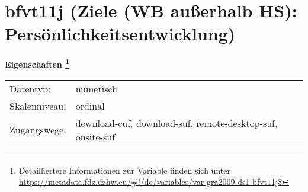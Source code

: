 
    \setcounter{footnote}{0}

    \vspace*{-1.8cm}
	\section{bfvt11j (Ziele (WB außerhalb HS): Persönlichkeitsentwicklung)}
	\label{section:bfvt11j}



    \vspace*{0.5cm}
    \noindent\textbf{Eigenschaften
	\footnote{Detailliertere Informationen zur Variable finden sich unter
		\url{https://metadata.fdz.dzhw.eu/\#!/de/variables/var-gra2009-ds1-bfvt11j$}}}\\
	\begin{tabularx}{\hsize}{@{}lX}
	Datentyp: & numerisch \\
	Skalenniveau: & ordinal \\
	Zugangswege: &
	  download-cuf, 
	  download-suf, 
	  remote-desktop-suf, 
	  onsite-suf
 \\
    \end{tabularx}



